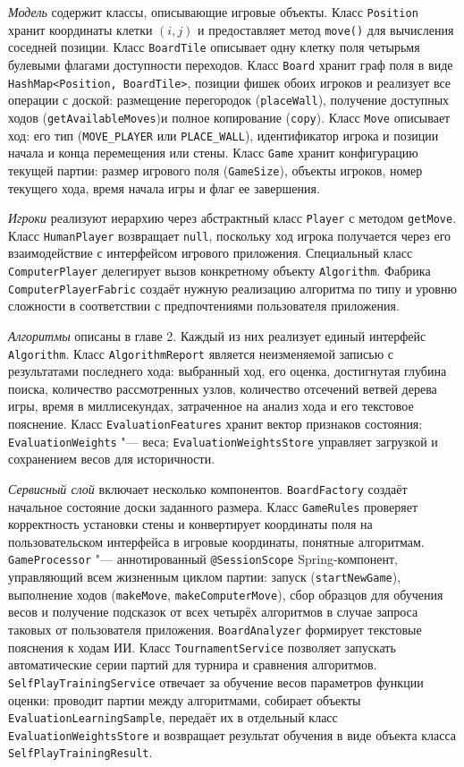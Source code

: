 \documentclass[a4paper,12pt]{diplom}
\begin{document}
\textit{Модель} содержит классы, описывающие игровые объекты. Класс \texttt{Position} хранит координаты клетки $(i, j)$ и предоставляет метод \texttt{move()} для вычисления соседней позиции. Класс \texttt{BoardTile} описывает одну клетку поля четырьмя булевыми флагами доступности переходов. Класс \texttt{Board} хранит граф поля в виде \texttt{HashMap<Position, BoardTile>}, позиции фишек обоих игроков и реализует все операции с доской: размещение перегородок (\texttt{placeWall}), получение доступных ходов (\texttt{getAvailableMoves})и полное копирование (\texttt{copy}). Класс \texttt{Move} описывает ход: его тип (\texttt{MOVE\_PLAYER} или \texttt{PLACE\_WALL}), идентификатор игрока и позиции начала и конца перемещения или стены. Класс \texttt{Game} хранит конфигурацию текущей партии: размер игрового поля (\texttt{GameSize}), объекты игроков, номер текущего хода, время начала игры и флаг ее завершения.

\textit{Игроки} реализуют иерархию через абстрактный класс \texttt{Player} с методом \texttt{getMove}. Класс \texttt{HumanPlayer} возвращает \texttt{null}, поскольку ход игрока получается через его взаимодействие с интерфейсом игрового приложения. Специальный класс \texttt{ComputerPlayer} делегирует вызов конкретному объекту \texttt{Algorithm}. Фабрика \texttt{ComputerPlayerFabric} создаёт нужную реализацию алгоритма по типу и уровню сложности в соответствии с предпочтениями пользователя приложения.

\textit{Алгоритмы} описаны в главе 2. Каждый из них реализует единый интерфейс \texttt{Algorithm}. Класс \texttt{AlgorithmReport} является неизменяемой записью с результатами последнего хода: выбранный ход, его оценка, достигнутая глубина поиска, количество рассмотренных узлов, количество отсечений ветвей дерева игры, время в миллисекундах, затраченное на анализ хода и его текстовое пояснение. Класс \texttt{EvaluationFeatures} хранит вектор признаков состояния; \texttt{EvaluationWeights} "--- веса; \texttt{EvaluationWeightsStore} управляет загрузкой и сохранением весов для историчности.

\textit{Сервисный слой} включает несколько компонентов. \texttt{BoardFactory} создаёт начальное состояние доски заданного размера. Класс \texttt{GameRules} проверяет корректность установки стены и конвертирует координаты поля на пользовательском интерфейса в игровые координаты, понятные алгоритмам. \texttt{GameProcessor} "--- аннотированный \texttt{@SessionScope} Spring-компонент, управляющий всем жизненным циклом партии: запуск (\texttt{startNewGame}), выполнение ходов (\texttt{makeMove}, \texttt{makeComputerMove}), сбор образцов для обучения весов и получение подсказок от всех четырёх алгоритмов в случае запроса таковых от пользователя приложения. \texttt{BoardAnalyzer} формирует текстовые пояснения к ходам ИИ. Класс \texttt{TournamentService} позволяет запускать автоматические серии партий для турнира и сравнения алгоритмов. \texttt{SelfPlayTrainingService} отвечает за обучение весов параметров функции оценки: проводит партии между алгоритмами, собирает объекты \texttt{EvaluationLearningSample}, передаёт их в отдельный класс \texttt{EvaluationWeightsStore} и возвращает результат обучения в виде объекта класса \texttt{SelfPlayTrainingResult}.
\end{document}
